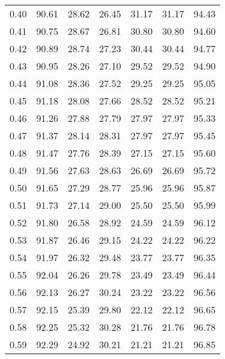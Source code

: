 \begin{tabular}{|c|c|c|c|c|c|c|}
      0.40 &     90.61 &     28.62 &      26.45 &   31.17 &      31.17 &         94.43 \\
      0.41 &     90.75 &     28.67 &      26.81 &   30.80 &      30.80 &         94.60 \\
      0.42 &     90.89 &     28.74 &      27.23 &   30.44 &      30.44 &         94.77 \\
      0.43 &     90.95 &     28.26 &      27.10 &   29.52 &      29.52 &         94.90 \\
      0.44 &     91.08 &     28.36 &      27.52 &   29.25 &      29.25 &         95.05 \\
      0.45 &     91.18 &     28.08 &      27.66 &   28.52 &      28.52 &         95.21 \\
      0.46 &     91.26 &     27.88 &      27.79 &   27.97 &      27.97 &         95.33 \\
      0.47 &     91.37 &     28.14 &      28.31 &   27.97 &      27.97 &         95.45 \\
      0.48 &     91.47 &     27.76 &      28.39 &   27.15 &      27.15 &         95.60 \\
      0.49 &     91.56 &     27.63 &      28.63 &   26.69 &      26.69 &         95.72 \\
      0.50 &     91.65 &     27.29 &      28.77 &   25.96 &      25.96 &         95.87 \\
      0.51 &     91.73 &     27.14 &      29.00 &   25.50 &      25.50 &         95.99 \\
      0.52 &     91.80 &     26.58 &      28.92 &   24.59 &      24.59 &         96.12 \\
      0.53 &     91.87 &     26.46 &      29.15 &   24.22 &      24.22 &         96.22 \\
      0.54 &     91.97 &     26.32 &      29.48 &   23.77 &      23.77 &         96.35 \\
      0.55 &     92.04 &     26.26 &      29.78 &   23.49 &      23.49 &         96.44 \\
      0.56 &     92.13 &     26.27 &      30.24 &   23.22 &      23.22 &         96.56 \\
      0.57 &     92.15 &     25.39 &      29.80 &   22.12 &      22.12 &         96.65 \\
      0.58 &     92.25 &     25.32 &      30.28 &   21.76 &      21.76 &         96.78 \\
      0.59 &     92.29 &     24.92 &      30.21 &   21.21 &      21.21 &         96.85 \\

\end{tabular}
